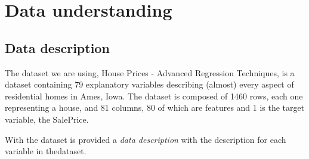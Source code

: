 


\chapter{Data understanding}
\label{sec:data_understanding}

\section{Data description}
\label{sec:data_description}

The dataset we are using, House Prices - Advanced Regression Techniques, is a dataset containing 79 explanatory variables describing (almost) every aspect of residential homes in Ames, Iowa. The dataset is composed of 1460 rows, each one representing a house, and 81 columns, 80 of which are features and 1 is the target variable, the SalePrice.

With the dataset is provided a \textit{data description} with the description for each variable in thedataset.

